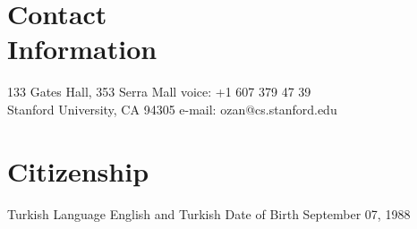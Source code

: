 \documentclass[margin,line,10pt]{resume}
\begin{document}
\begin{resume}

    \section{\mysidestyle \textcolor{olgray}{Contact\\Information}}
    133 Gates Hall, 353 Serra Mall        \hfill voice: +1 607 379 47 39          \vspace{0mm}\\\vspace{0mm}%
    Stanford University, CA 94305 \hfill e-mail: ozan@cs.stanford.edu \vspace{0mm}\\\vspace{0mm}%



%
%
%


\section{\mysidestyle \textcolor{olgray}{Citizenship}} Turkish \hspace{13.9mm} {\mysidestyle \textcolor{olgray}{Language}} \hspace{3.56mm} English and Turkish \hfill {\mysidestyle \textcolor{olgray}{Date of Birth}}  \hspace{3.56mm} September 07, 1988

\end{resume}
\end{document}
